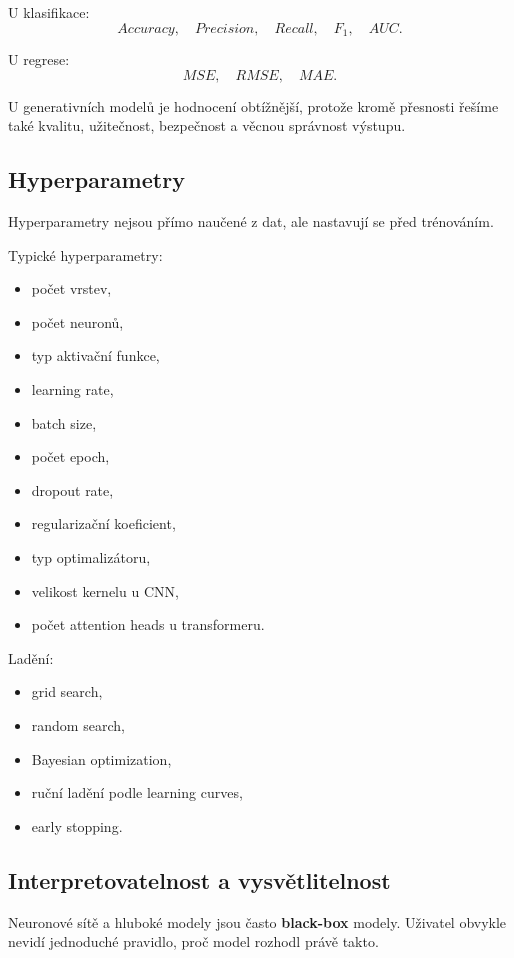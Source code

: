 U klasifikace:
\[
Accuracy,\quad Precision,\quad Recall,\quad F_1,\quad AUC.
\]

U regrese:
\[
MSE,\quad RMSE,\quad MAE.
\]

U generativních modelů je hodnocení obtížnější, protože kromě přesnosti řešíme také kvalitu, užitečnost,
bezpečnost a věcnou správnost výstupu.

\subsection{Hyperparametry}

Hyperparametry nejsou přímo naučené z dat, ale nastavují se před trénováním.

Typické hyperparametry:
\begin{itemize}
    \item počet vrstev,
    \item počet neuronů,
    \item typ aktivační funkce,
    \item learning rate,
    \item batch size,
    \item počet epoch,
    \item dropout rate,
    \item regularizační koeficient,
    \item typ optimalizátoru,
    \item velikost kernelu u CNN,
    \item počet attention heads u transformeru.
\end{itemize}

Ladění:
\begin{itemize}
    \item grid search,
    \item random search,
    \item Bayesian optimization,
    \item ruční ladění podle learning curves,
    \item early stopping.
\end{itemize}

\subsection{Interpretovatelnost a vysvětlitelnost}

Neuronové sítě a hluboké modely jsou často \textbf{black-box} modely. Uživatel obvykle nevidí jednoduché
pravidlo, proč model rozhodl právě takto.

